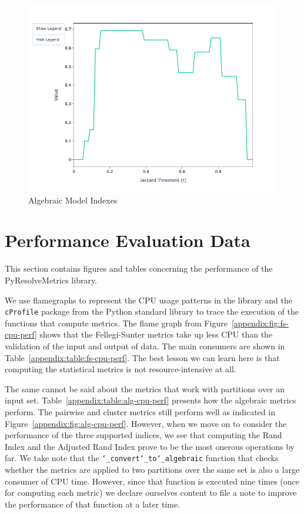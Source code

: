 \documentclass[a4paper,twoside]{article}
\begin{document}
\begin{figure}[htbp]
\begin{minipage}{0.32\textwidth}
            \includegraphics[width=\textwidth]{sample-usage/mini-alg-ari}
        \end{minipage}
        \caption{Algebraic Model Indexes}\label{appendix:fig:alg-indexes}
    \end{figure}

    \section{Performance Evaluation Data}\label{appendix:sec:perf}
    This section contains figures and tables concerning the performance of the
    PyResolveMetrics library.

    We use flamegraphs\cite{flamegraphs2013} to represent the CPU usage
    patterns in the library and the \texttt{cProfile} package from the Python
    standard library to trace the execution of the functions that compute
    metrics.
    The flame graph from Figure~\ref{appendix:fig:fs-cpu-perf}
    shows that the Fellegi-Sunter metrics take up less CPU than the validation
    of the input and output of data. 
    The main consumers are shown in Table~\ref{appendix:table:fs-cpu-perf}.  
    The best lesson we can learn here is that computing the statistical metrics
    is not resource-intensive at all. 

    The same cannot be said about the metrics that work with partitions over an
    input set. 
    Table~\ref{appendix:table:alg-cpu-perf} presents how the algebraic metrics perform. 
    The pairwise and cluster metrics still perform well as indicated in
    Figure~\ref{appendix:fig:alg-cpu-perf}. 
    However, when we move on to consider the performance of the three supported
    indices, we see that computing the Rand Index and the Adjusted Rand Index
    prove to be the most onerous operations by far. 
    We take note that the \texttt{\char`_convert\char`_to\char`_algebraic}
    function that checks whether the metrics are applied to two partitions over
    the same set is also a large consumer of CPU time.
    However, since that function is executed nine times (once for computing each
    metric) we declare ourselves content to file a note to improve the
    performance of that function at a later time.
\end{document}
